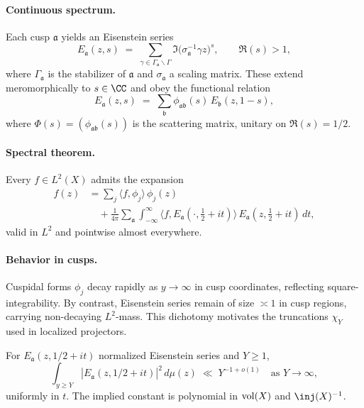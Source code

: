 \paragraph{Continuous spectrum.}
Each cusp $\mathfrak{a}$ yields an Eisenstein series
\begin{equation}\label{eq:Eisenstein}
  E_\mathfrak{a}(z,s) \;=\; \sum_{\gamma\in \Gamma_\mathfrak{a}\backslash\Gamma}
  \Im\!\big(\sigma_\mathfrak{a}^{-1}\gamma z\big)^s, \qquad \Re(s)>1,
\end{equation}
where $\Gamma_\mathfrak{a}$ is the stabilizer of $\mathfrak{a}$ and $\sigma_\mathfrak{a}$ a scaling matrix. These extend meromorphically to $s\in\CC$ and obey the functional relation
\begin{equation}\label{eq:Eisenstein-functional}
  E_\mathfrak{a}(z,s) \;=\; \sum_{\mathfrak{b}} \phi_{\mathfrak{a}\mathfrak{b}}(s)\,
  E_\mathfrak{b}(z,1-s),
\end{equation}
where $\Phi(s)=(\phi_{\mathfrak{a}\mathfrak{b}}(s))$ is the scattering matrix, unitary on $\Re(s)=1/2$.

\paragraph{Spectral theorem.}
Every $f\in L^2(X)$ admits the expansion
\begin{equation}\label{eq:spectral-expansion}
\begin{aligned}
  f(z) &= \sum_j \langle f,\phi_j\rangle\,\phi_j(z) \\
  &\quad+ \frac{1}{4\pi}\sum_{\mathfrak{a}}\int_{-\infty}^{\infty}
     \langle f, E_\mathfrak{a}(\cdot,\tfrac12+it)\rangle\,
     E_\mathfrak{a}(z,\tfrac12+it)\,dt,
\end{aligned}
\end{equation}
valid in $L^2$ and pointwise almost everywhere.

\paragraph{Behavior in cusps.}
Cuspidal forms $\phi_j$ decay rapidly as $y\to\infty$ in cusp coordinates, reflecting square-integrability. By contrast, Eisenstein series remain of size $\asymp 1$ in cusp regions, carrying non-decaying $L^2$-mass. This dichotomy motivates the truncations $\chi_Y$ used in localized projectors.

\begin{lemma}\label{lem:eisenstein-mass}
For $E_\mathfrak{a}(z,1/2+it)$ normalized Eisenstein series and $Y\ge 1$,
\begin{equation}\label{eq:eisenstein-mass}
  \int_{y\ge Y} |E_\mathfrak{a}(z,1/2+it)|^2 \, d\mu(z)
  \;\ll\; Y^{-1+o(1)}\quad \text{as } Y\to\infty,
\end{equation}
uniformly in $t$. The implied constant is polynomial in $\operatorname{vol}(X)$ and $\inj(X)^{-1}$.
\end{lemma}

